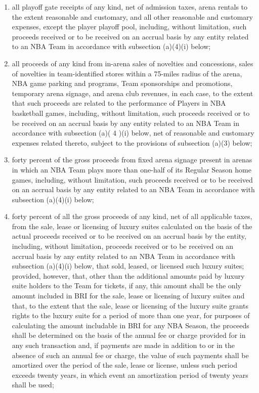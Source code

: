 \documentclass[
]{book}
\begin{document}
\begin{enumerate}
\begin{enumerate}
\begin{enumerate}
    \item
      all playoff gate receipts of any kind, net of admission taxes, arena rentals to the extent reasonable and customary, and all other reasonable and customary expenses, except the player playoff pool, including, without limitation, such proceeds received or to be received on an accrual basis by any entity related to an NBA Team in accordance with subsection (a)(4)(i) below;
    \item
      all proceeds of any kind from in-arena sales of novelties and concessions, sales of novelties in team-identified stores within a 75-miles radius of the arena, NBA game parking and programs, Team sponsorships and promotions, temporary arena signage, and arena club revenues, in each case, to the extent that such proceeds are related to the performance of Players in NBA basketball games, including, without limitation, such proceeds received or to be received on an accrual basis by any entity related to an NBA Team in accordance with subsection (a)( 4 )(i) below, net of reasonable and customary expenses related thereto, subject to the provisions of subsection (a)(3) below;
    \item
      forty percent of the gross proceeds from fixed arena signage present in arenas in which an NBA Team plays more than one-half of its Regular Season home games, including, without limitation, such proceeds received or to be received on an accrual basis by any entity related to an NBA Team in accordance with subsection (a)(4)(i) below;
    \item
      forty percent of all the gross proceeds of any kind, net of all applicable taxes, from the sale, lease or licensing of luxury suites calculated on the basis of the actual proceeds received or to be received on an accrual basis by the entity, including, without limitation, proceeds received or to be received on an accrual basis by any entity related to an NBA Team in accordance with subsection (a)(4)(i) below, that sold, leased, or licensed such luxury suites; provided, however, that, other than the additional amounts paid by luxury suite holders to the Team for tickets, if any, this amount shall be the only amount included in BRI for the sale, lease or licensing of luxury suites and that, to the extent that the sale, lease or licensing of the luxury suite grants rights to the luxury suite for a period of more than one year, for purposes of calculating the amount includable in BRI for any NBA Season, the proceeds shall be determined on the basis of the annual fee or charge provided for in any such transaction and, if payments are made in addition to or in the absence of such an annual fee or charge, the value of such payments shall be amortized over the period of the sale, lease or license, unless such period exceeds twenty years, in which event an amortization period of twenty years shall be used;

\end{enumerate}
\end{enumerate}
\end{enumerate}
\end{document}
